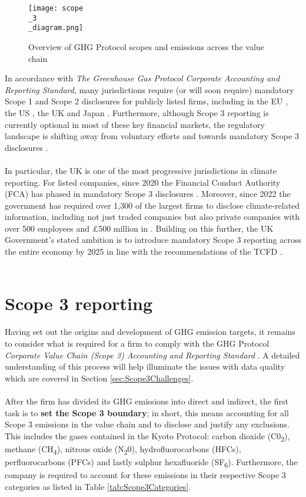 \documentclass[12pt,twoside]{report}
\newcommand\fnote[1]{\captionsetup{font=scriptsize, justification=raggedright, singlelinecheck=false}\subcaption*{\textit{#1}}}
\begin{document}
\begin{figure}[H]
	\centering
	\caption{Overview of GHG Protocol scopes and emissions across the value chain}
	\label{fig:Scope3Diagram}
	\texttt{[image: scope\\\_3\\\_diagram.png]}
	\fnote{Source: \cite{ghgscope32013}, p.6}
\end{figure}

In accordance with \textit{The Greenhouse Gas Protocol Corporate Accounting and Reporting Standard}, many jurisdictions require (or will soon require) mandatory Scope 1 and Scope 2 disclosures for publicly listed firms, including in the EU \cite{eu20232772}, the US \cite{sec2024}, the UK \cite{ukleg2013} and Japan \cite{fsa2022}. Furthermore, although Scope 3 reporting is currently optional in most of these key financial markets, the regulatory landscape is shifting away from voluntary efforts and towards mandatory Scope 3 disclosures \cite{ftserussell2024}. 
\\ \\
In particular, the UK is one of the most progressive jurisdictions in climate reporting. For listed companies, since 2020 the Financial Conduct Authority (FCA) has phased in mandatory Scope 3 disclosures \cite{fca2020, fca2021}. Moreover, since 2022 the government has required over 1,300 of the largest firms to disclose climate-related information, including not just traded companies but also private companies with over 500 employees and £500 million in  \cite{UK2021}. Building on this further, the UK Government's stated ambition is to introduce mandatory Scope 3 reporting across the entire economy by 2025 in line with the recommendations of the TCFD \cite{ukgov2020}. 
\\ \\
\section{Scope 3 reporting} \label{sec:Scope3Reporting}
Having set out the origins and development of GHG emission targets, it remains to consider what is required for a firm to comply with the GHG Protocol \textit{Corporate Value Chain (Scope 3) Accounting and Reporting Standard} \cite{ghgscope32013}. A detailed understanding of this process will help illuminate the issues with data quality which are covered in Section \ref{sec:Scope3Challenges}.
\\ \\
After the firm has divided its GHG emissions into direct and indirect, the first task is to \textbf{set the Scope 3 boundary}; in short, this means accounting for all Scope 3 emissions in the value chain and to disclose and justify any exclusions. This includes the gases contained in the Kyoto Protocol: carbon dioxide (C0\textsubscript{2}), methane (CH\textsubscript{4}), nitrous oxide (N\textsubscript{2}0), hydrofluorocarbons (HFCs), perfluorocarbons (PFCs) and lastly sulphur hexafluoride (SF\textsubscript{6}). Furthermore, the company is required to account for these emissions in their respective Scope 3 categories as listed in Table \ref{tab:Scope3Categories}. 
\end{document}

